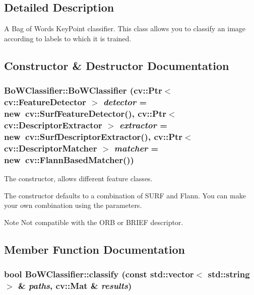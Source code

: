 \subsection{Detailed Description}
A Bag of Words KeyPoint classifier. This class allows you to classify an image according to labels to which it is trained. 

\subsection{Constructor \& Destructor Documentation}
\hypertarget{classBoWClassifier_a2f0e69f7e1b1f5a5f4a1aa16fa584add}{
\subsubsection[{BoWClassifier}]{\setlength{\rightskip}{0pt plus 5cm}BoWClassifier::BoWClassifier (cv::Ptr$<$ cv::FeatureDetector $>$ {\em detector} = {\ttfamily new~cv::SurfFeatureDetector()}, \/  cv::Ptr$<$ cv::DescriptorExtractor $>$ {\em extractor} = {\ttfamily new~cv::SurfDescriptorExtractor()}, \/  cv::Ptr$<$ cv::DescriptorMatcher $>$ {\em matcher} = {\ttfamily new~cv::FlannBasedMatcher()})}}
\label{classBoWClassifier_a2f0e69f7e1b1f5a5f4a1aa16fa584add}


The constructor, allows different feature classes. 

The constructor defaults to a combination of SURF and Flann. You can make your own combination using the parameters.

\begin{DoxyNote}{Note}
Not compatible with the ORB or BRIEF descriptor. 
\end{DoxyNote}


\subsection{Member Function Documentation}
\hypertarget{classBoWClassifier_a6f3d7ed5430e4dd9f0093a1cdc909c49}{
\subsubsection[{classify}]{\setlength{\rightskip}{0pt plus 5cm}bool BoWClassifier::classify (const std::vector$<$ std::string $>$ \& {\em paths}, \/  cv::Mat \& {\em results})}}
\label{classBoWClassifier_a6f3d7ed5430e4dd9f0093a1cdc909c49}


